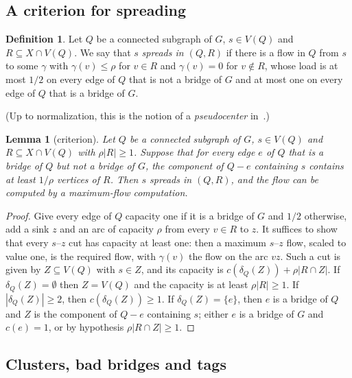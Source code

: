 \documentclass[11pt,letterpaper]{article}
\newtheorem{lemma}[theorem]{Lemma}
\theoremstyle{definition}
\newtheorem{definition}[theorem]{Definition}
\begin{document}
\subsection{A criterion for spreading}\label{sec:criterion}

\begin{definition}
Let $Q$ be a connected subgraph of $G$, $s\in V(Q)$ and $R\subseteq X\cap V(Q)$. We say that $s$
\emph{spreads in $(Q,R)$} if there is a flow in $Q$ from $s$ to some $\gamma$ with
$\gamma(v)\le\rho$ for $v\in R$ and $\gamma(v)=0$ for $v\notin R$, whose load is at most $1/2$
on every edge of $Q$ that is not a bridge of $G$ and at most one on every edge of $Q$ that is a
bridge of $G$.
\end{definition}

(Up to normalization, this is the notion of a \emph{pseudocenter} in~\cite{CKS13}.)

\begin{lemma}[criterion]\label{lem:criterion}
Let $Q$ be a connected subgraph of $G$, $s\in V(Q)$ and $R\subseteq X\cap V(Q)$ with
$\rho|R|\ge1$. Suppose that for every edge $e$ of $Q$ that is a bridge of $Q$ but not a bridge
of $G$, the component of $Q-e$ containing $s$ contains at least $1/\rho$ vertices of $R$.
Then $s$ spreads in $(Q,R)$, and the flow can be computed by a maximum-flow computation.
\end{lemma}
\begin{proof}
Give every edge of $Q$ capacity one if it is a bridge of $G$ and $1/2$ otherwise, add a sink
$z$ and an arc of capacity $\rho$ from every $v\in R$ to $z$. It suffices to show that every
$s$--$z$ cut has capacity at least one: then a maximum $s$--$z$ flow, scaled to value one,
is the required flow, with $\gamma(v)$ the flow on the arc $vz$. Such a cut is given by $Z\subseteq V(Q)$ with $s\in Z$,
and its capacity is $c(\delta_Q(Z))+\rho|R\cap Z|$. If $\delta_Q(Z)=\emptyset$ then $Z=V(Q)$
and the capacity is at least $\rho|R|\ge1$. If $|\delta_Q(Z)|\ge2$, then
$c(\delta_Q(Z))\ge1$. If $\delta_Q(Z)=\{e\}$, then $e$ is a bridge of $Q$ and $Z$ is the
component of $Q-e$ containing $s$; either $e$ is a bridge of $G$ and $c(e)=1$, or by
hypothesis $\rho|R\cap Z|\ge1$.
\end{proof}

\subsection{Clusters, bad bridges and tags}\label{sec:clusters}
\end{document}
